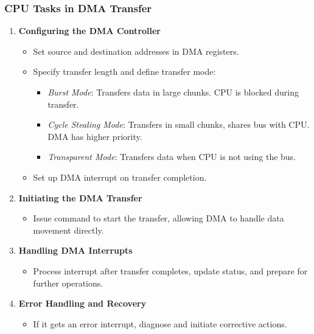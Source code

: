 \begin{frame}
    \frametitle{CPU Tasks in DMA Transfer}

    \begin{enumerate}
        \item \textbf{Configuring the DMA Controller}
            \begin{itemize}
                \item Set source and destination addresses in DMA registers.
                \item Specify transfer length and define transfer mode:
                \begin{itemize}
                    \item \textit{Burst Mode}: Transfers data in large chunks. CPU is blocked during transfer.
                    \item \textit{Cycle Stealing Mode}: Transfers in small chunks, shares bus with CPU. DMA has higher priority.
                    \item \textit{Transparent Mode}: Transfers data when CPU is not using the bus.
                \end{itemize}
                \item Set up DMA interrupt on transfer completion.
            \end{itemize}
        
        \item \textbf{Initiating the DMA Transfer}
            \begin{itemize}
                \item Issue command to start the transfer, allowing DMA to handle data movement directly.
            \end{itemize}
        
        \item \textbf{Handling DMA Interrupts}
            \begin{itemize}
                \item Process interrupt after transfer completes, update status, and prepare for further operations.
            \end{itemize}
        
        \item \textbf{Error Handling and Recovery}
            \begin{itemize}
                \item If it gets an error interrupt, diagnose and initiate corrective actions.
            \end{itemize}
    \end{enumerate}
\end{frame}

